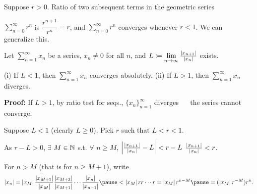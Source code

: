 \documentclass[10pt,aspectratio=169]{beamer}
\begin{document}
\begin{frame}
Suppose $r > 0$.
Ratio of two subsequent terms in the geometric series

$\displaystyle \sum_{n=0}^\infty r^n$ is $\dfrac{r^{n+1}}{r^n} = r$, and $\displaystyle\sum_{n=0}^\infty r^n$ converges
whenever $r < 1$.
%
\pause
%
We can generalize this.

\begin{proposition}
Let $\displaystyle\sum_{n=1}^\infty x_n$ be a series, $x_n \not= 0$ for all $n$, and \quad
$L \coloneqq \lim\limits_{n\to\infty} \frac{\left\lvert {x_{n+1}} \right\rvert}{\left\lvert {x_n} \right\rvert}$ \quad exists.

\pause
(i)
If $L < 1$, then $\displaystyle\sum_{n=1}^\infty x_n$ converges absolutely.
\qquad
\pause
(ii)
If $L > 1$, then $\displaystyle\sum_{n=1}^\infty x_n$ diverges.
\end{proposition}

\pause
\textbf{Proof:}
If $L > 1$, by ratio test for seqs., $\{ x_n \}_{n=1}^\infty$ diverges ~\thus~
the series
cannot converge.

\pause
\medskip

Suppose $L < 1$ (clearly $L \geq 0$).
\quad
\pause
Pick $r$ such that $L < r < 1$.

\pause
\medskip

As $r-L > 0$, $\exists$ $M \in {\mathbb{N}}$ s.t. $\forall$ $n \geq M$,
\quad
$\left\lvert {\frac{\left\lvert {x_{n+1}} \right\rvert}{\left\lvert {x_n} \right\rvert} - L} \right\rvert < r-L$
\wthus
$\frac{\left\lvert {x_{n+1}} \right\rvert}{\left\lvert {x_n} \right\rvert} < r$.

\pause
\medskip

For $n > M$ (that is for $n \geq M+1$),
write
\begin{equation*}
\abs{x_n} =
\abs{x_M}
\frac{\abs{x_{M+1}}}{\abs{x_{M}}}
\frac{\abs{x_{M+2}}}{\abs{x_{M+1}}}
\cdots
\frac{\abs{x_{n}}}{\abs{x_{n-1}}}
\pause
<
\abs{x_M}
r r \cdots r = \abs{x_M} r^{n-M}
\pause
= (\abs{x_M} r^{-M}) r^n .
\end{equation*}

\end{frame}
\end{document}
